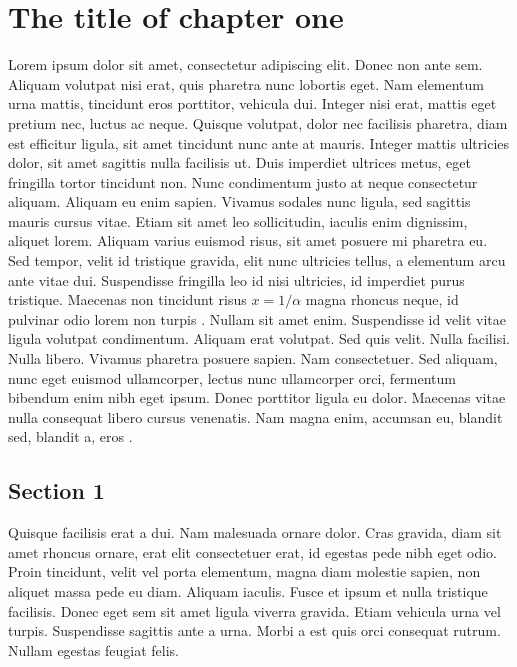 \chapter{The title of chapter one}

Lorem ipsum dolor sit amet, consectetur adipiscing elit. Donec non ante sem. Aliquam volutpat nisi erat, quis pharetra nunc lobortis eget. Nam elementum urna mattis, tincidunt eros porttitor, vehicula dui. Integer nisi erat, mattis eget pretium nec, luctus ac neque. Quisque volutpat, dolor nec facilisis pharetra, diam est efficitur ligula, sit amet tincidunt nunc ante at mauris. Integer mattis ultricies dolor, sit amet sagittis nulla facilisis ut. Duis imperdiet ultrices metus, eget fringilla tortor tincidunt non. Nunc condimentum justo at neque consectetur aliquam. Aliquam eu enim sapien. Vivamus sodales nunc ligula, sed sagittis mauris cursus vitae. Etiam sit amet leo sollicitudin, iaculis enim dignissim, aliquet lorem. Aliquam varius euismod risus, sit amet posuere mi pharetra eu. Sed tempor, velit id tristique gravida, elit nunc ultricies tellus, a elementum arcu ante vitae dui. Suspendisse fringilla leo id nisi ultricies, id imperdiet purus tristique. Maecenas non tincidunt risus $x = 1/\alpha$ magna rhoncus neque, id pulvinar odio lorem non turpis \cite{brin2012reprint, russell1995artificial}. Nullam sit amet enim. Suspendisse id velit vitae ligula volutpat condimentum. Aliquam erat volutpat. Sed quis velit. Nulla facilisi. Nulla libero. Vivamus pharetra posuere sapien. Nam consectetuer. Sed aliquam, nunc eget euismod ullamcorper, lectus nunc ullamcorper orci, fermentum bibendum enim nibh eget ipsum. Donec porttitor ligula eu dolor. Maecenas vitae nulla consequat libero cursus venenatis. Nam magna enim, accumsan eu, blandit sed, blandit a, eros \cite{google}.

\section{Section 1}
Quisque facilisis erat a dui. Nam malesuada ornare dolor. Cras gravida, diam sit amet rhoncus ornare, erat elit consectetuer erat, id egestas pede nibh eget odio. Proin tincidunt, velit vel porta elementum, magna diam molestie sapien, non aliquet massa pede eu diam. Aliquam iaculis. Fusce et ipsum et nulla tristique facilisis. Donec eget sem sit amet ligula viverra gravida. Etiam vehicula urna vel turpis. Suspendisse sagittis ante a urna. Morbi a est quis orci consequat rutrum. Nullam egestas feugiat felis.

